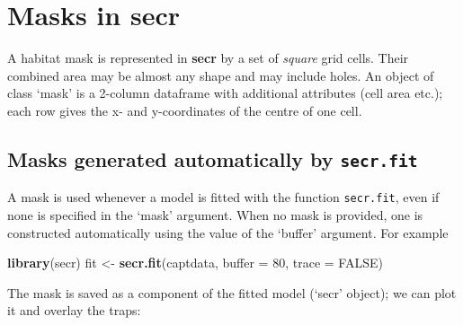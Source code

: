 \documentclass[
]{book}
\newenvironment{Shaded}{\begin{snugshade}}{\end{snugshade}}
\newcommand{\AttributeTok}[1]{\textcolor[rgb]{0.13,0.29,0.53}{#1}}
\newcommand{\ConstantTok}[1]{\textcolor[rgb]{0.56,0.35,0.01}{#1}}
\newcommand{\DecValTok}[1]{\textcolor[rgb]{0.00,0.00,0.81}{#1}}
\newcommand{\FunctionTok}[1]{\textcolor[rgb]{0.13,0.29,0.53}{\textbf{#1}}}
\newcommand{\NormalTok}[1]{#1}
\newcommand{\OtherTok}[1]{\textcolor[rgb]{0.56,0.35,0.01}{#1}}
\newcommand{\SpecialCharTok}[1]{\textcolor[rgb]{0.81,0.36,0.00}{\textbf{#1}}}
\newcommand{\StringTok}[1]{\textcolor[rgb]{0.31,0.60,0.02}{#1}}
\begin{document}
\section{\texorpdfstring{Masks in \textbf{secr}}{Masks in secr}}\label{masks-in-secr}

A habitat mask is represented in \textbf{secr} by a set of \emph{square} grid cells. Their combined area may be almost any shape and may include holes. An object of class `mask' is a 2-column dataframe with additional attributes (cell area etc.); each row gives the x- and y-coordinates of the centre of one cell.

\subsection{\texorpdfstring{Masks generated automatically by \texttt{secr.fit}}{Masks generated automatically by secr.fit}}\label{masks-generated-automatically-by-secr.fit}

A mask is used whenever a model is fitted with the function \texttt{secr.fit}, even if none is specified in the `mask' argument. When no mask is provided, one is constructed automatically using the value of the `buffer' argument. For example

\begin{Shaded}
\begin{Highlighting}[]
\FunctionTok{library}\NormalTok{(secr)}
\NormalTok{fit }\OtherTok{\textless{}{-}} \FunctionTok{secr.fit}\NormalTok{(captdata, }\AttributeTok{buffer =} \DecValTok{80}\NormalTok{, }\AttributeTok{trace =} \ConstantTok{FALSE}\NormalTok{)}
\end{Highlighting}
\end{Shaded}

The mask is saved as a component of the fitted model (`secr' object); we can plot it and overlay the traps:

\begin{Shaded}
\end{Shaded}
\end{document}
